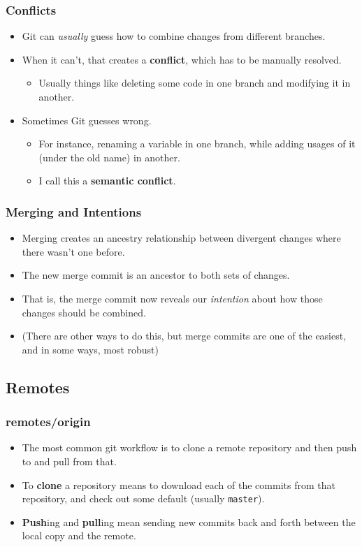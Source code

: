 \documentclass{beamer}
\begin{document}
\begin{frame}
  \frametitle{Conflicts}
  \begin{itemize}
    \pause
  \item Git can \textit{usually} guess how to combine changes from different branches.
    \pause
  \item When it can't, that creates a \textbf{conflict}, which has to be manually resolved.
    \begin{itemize}
      \pause
    \item Usually things like deleting some code in one branch and modifying it in another.
    \end{itemize}
    \pause
  \item Sometimes Git guesses wrong.
    \begin{itemize}
      \pause
    \item For instance, renaming a variable in one branch, while adding usages of it (under the old name) in another.
      \pause
    \item I call this a \textbf{semantic conflict}.
    \end{itemize}
  \end{itemize}
\end{frame}

\begin{frame}
  \frametitle{Merging and Intentions}

  \begin{itemize}
    \pause
  \item Merging creates an ancestry relationship between divergent changes where there wasn't one before.
    \pause
  \item The new merge commit is an ancestor to both sets of changes.
    \pause
  \item That is, the merge commit now reveals our \textit{intention} about how those changes should be combined.
    \pause
  \item (There are other ways to do this, but merge commits are one of the easiest, and in some ways, most robust)
  \end{itemize}
\end{frame}

\subsection{Remotes}

\begin{frame}
  \frametitle{remotes/origin}
  \begin{itemize}
    \pause
  \item The most common git workflow is to clone a remote repository and then push to and pull from that.
    \pause
  \item To \textbf{clone} a repository means to download each of the commits from that repository, and check out some default (usually \texttt{master}).
    \pause
  \item \textbf{Push}ing and \textbf{pull}ing mean sending new commits back and forth between the local copy and the remote.
  \end{itemize}
\end{frame}
\end{document}
